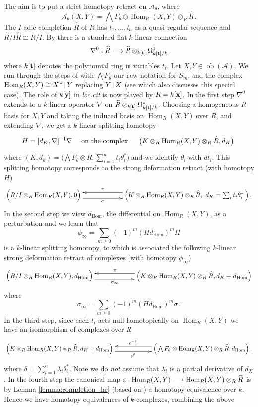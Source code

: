 \documentclass[english,letter paper,12pt,leqno]{article}
\theoremstyle{example}
\numberwithin{equation}{section}
\def\AA{\mathcal{A}}
\def\ob{\operatorname{ob}}
\def\Hom{\operatorname{Hom}}
\begin{document}
The aim is to put a strict homotopy retract \cite[\S 3.3]{lazaroiu} on $\AA_\theta$, where
\[
\AA_\theta(X,Y) = \bigwedge F_\theta \otimes \Hom_R(X,Y) \otimes_R \widehat{R}\,.
\]
The $I$-adic completion $\widehat{R}$ of $R$ has $t_1,\ldots,t_n$ as a quasi-regular sequence and $\widehat{R}/I \widehat{R} \cong R/I$. By \cite[Appendix B]{pushforward} there is a standard flat $k$-linear connection
\[
\nabla^0: \widehat{R} \longrightarrow \widehat{R} \otimes_{k[\bold{t}]} \Omega^1_{k[\bold{t}]/k}
\]
where $k[\bold{t}]$ denotes the polynomial ring in variables $t_i$. Let $X,Y \in \ob(\AA)$. We run through the steps of \cite[\S 4.3]{cut} with $\bigwedge F_\theta$ our new notation for $S_m$, and the complex $\Hom_R(X,Y) \cong X^{\vee} \l Y$ replacing $Y \,|\, X$ (see \cite[\S 4.5]{cut} which also discusses this special case). The role of $k[\bold{y}]$ in \emph{loc.cit} is now played by $R = k[\bold{x}]$. In the first step $\nabla^0$ extends to a $k$-linear operator $\nabla$ on $\widehat{R} \otimes_{k[\bold{t}]} \Omega^*_{k[\bold{t}]/k}$. Choosing a homogeneous $R$-basis for $X,Y$ and taking the induced basis on $\Hom_R(X,Y)$ over $R$, and extending $\nabla$, we get a $k$-linear splitting homotopy
\[
H = [d_K, \nabla]^{-1} \nabla \quad \text{ on the complex } \quad \xymatrix{ \big( K \otimes_R \Hom_R(X,Y) \otimes_R \widehat{R}, d_K \big) }
\]
where $(K,d_k) = \big( \bigwedge F_\theta \otimes R, \sum_{i=1}^n t_i \theta_i^* \big)$ and we identify $\theta_i$ with $dt_i$. This splitting homotopy corresponds to the strong deformation retract (with homotopy $H$)
\[
\xymatrix@C+3pc{
\Big(R/I \otimes_R \Hom_R(X,Y),0\Big) \ar@<-1ex>[r]_-\sigma & \Big( K \otimes_R \Hom_R(X,Y) \otimes_R \widehat{R}, \,\,d_K = \sum_i t_i \theta_i^*\, \Big)\,, \ar@<-1ex>[l]_-\pi
}
\]
In the second step we view $d_{\Hom}$, the differential on $\Hom_R(X,Y)$, as a perturbation and we learn that
\[
\phi_\infty = \sum_{m \ge 0} (-1)^m (H d_{\Hom})^m H
\]
is a $k$-linear splitting homotopy, to which is associated the following $k$-linear strong deformation retract of complexes (with homotopy $\phi_{\infty}$)
\[
\xymatrix@C+3pc@R+3pc{
\Big( R/I \otimes_R \Hom_R(X,Y), d_{\Hom} \Big) \ar@<-1ex>[r]_-{\sigma_\infty} &
\Big( K \otimes_R \Hom_R(X,Y) \otimes_R \widehat{R}, d_K + d_{\Hom} \Big) \ar@<-1ex>[l]_-{\pi}
}
\]
where
\[
\sigma_\infty = \sum_{m \ge 0} (-1)^m (H d_{\Hom})^m \sigma\,.
\]
In the third step, since each $t_i$ acts null-homotopically on $\Hom_R(X,Y)$ we have an isomorphism of complexes over $R$
\[
\xymatrix@C+3pc{
\Big( K \otimes_R \Hom_R(X,Y) \otimes_R \widehat{R}, d_K + d_{\Hom} \Big) \ar@<-1ex>[r]_-{e^{\delta}} & \Big( \bigwedge F_\theta \otimes \Hom_R(X,Y) \otimes_R \widehat{R}, d_{\Hom} \Big)\,, \ar@<-1ex>[l]_-{e^{-\delta}}
}
\]
where $\delta = \sum_{i=1}^n \lambda_i \theta_i^*$. Note we do \emph{not} assume that $\lambda_i$ is a partial derivative of $d_X$. In the fourth step the canonical map $\varepsilon: \Hom_R(X,Y) \lto \Hom_R(X,Y) \otimes_R \widehat{R}$ is by Lemma \ref{lemma:completion_he} (based on \cite[Remark 7.7]{pushforward}) a homotopy equivalence over $k$. Hence we have homotopy equivalences of $k$-complexes, combining the above
\end{document}
